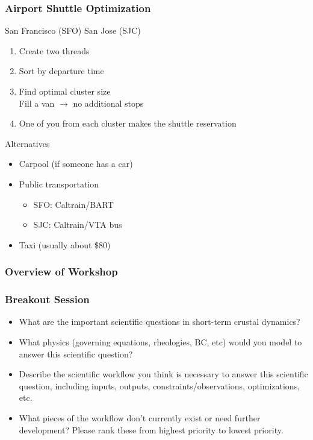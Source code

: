\documentclass{beamer}
\begin{document}
\begin{frame}
  \frametitle{Airport Shuttle Optimization}
  \summary{}

  \vfill
  San Francisco (SFO) \hfill San Jose (SJC)
  \vfill
    

  \begin{enumerate}
  \item Create two threads\\
  \item Sort by departure time
  \item Find optimal cluster size\\
    Fill a van $\rightarrow$ no additional stops
  \item One of you from each cluster makes the shuttle reservation
  \end{enumerate}
  \vfill

  Alternatives
  \begin{itemize}
  \item Carpool (if someone has a car)
  \item Public transportation
    \begin{itemize}
    \item SFO: Caltrain/BART
    \item SJC: Caltrain/VTA bus
    \end{itemize}
  \item Taxi (usually about \$80)
  \end{itemize}
  
\end{frame}

\begin{frame}
  \frametitle{Overview of Workshop}
  
  

\end{frame}


\begin{frame}
  \frametitle{Breakout Session}

  \begin{itemize}
  \item What are the important scientific questions in short-term crustal dynamics?
  \item What physics (governing equations, rheologies, BC, etc) would
    you model to answer this scientific question?
  \item Describe the scientific workflow you think is necessary to
    answer this scientific question, including inputs, outputs,
    constraints/observations, optimizations, etc.
  \item What pieces of the workflow don’t currently exist or need
    further development? Please rank these from highest priority to
    lowest priority.
  \end{itemize}

\end{frame}
\end{document}
